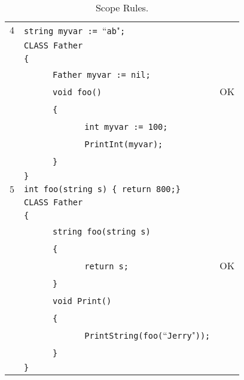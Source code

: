 \documentclass{article}
\begin{document}
\begin{table}[h]
\begin{tabular}{|l|l|l|}
\hline
 $4$ & \verb"string myvar := "``\verb"ab""\verb";" &    \\
     & \verb"CLASS Father"                         &    \\
     & \verb"{"                                    &    \\
     & ~ ~ ~ ~\verb"Father myvar := nil;"          &    \\
     & ~ ~ ~ ~\verb"void foo()"                    & OK \\
     & ~ ~ ~ ~\verb"{"                             &    \\
     & ~ ~ ~ ~ ~ ~ ~ ~\verb"int myvar := 100;"     &    \\
     & ~ ~ ~ ~ ~ ~ ~ ~\verb"PrintInt(myvar);"      &    \\
     & ~ ~ ~ ~\verb"}"                             &    \\
     & \verb"}"                                    &    \\
\hline
 $5$ & \verb"int foo(string s) { return 800;}"    &    \\
     & \verb"CLASS Father"                        &    \\
     & \verb"{"                                   &    \\
     & ~ ~ ~ ~\verb"string foo(string s)"         &    \\
     & ~ ~ ~ ~\verb"{"                            &    \\
     & ~ ~ ~ ~ ~ ~ ~ ~\verb"return s;"            & OK \\
     & ~ ~ ~ ~\verb"}"                            &    \\
     & ~ ~ ~ ~\verb"void Print()"                 &    \\
     & ~ ~ ~ ~\verb"{"                            &    \\
     & ~ ~ ~ ~ ~ ~ ~ ~\verb"PrintString(foo("``\verb"Jerry""\verb"));"  & \\
     & ~ ~ ~ ~\verb"}"                            &    \\
     & \verb"}"                                   &    \\
\hline
\end{tabular}
\caption{Scope Rules.
\label{Table_Code_Examples_Scope_Rules}}
\end{table}
\newpage
\end{document}
